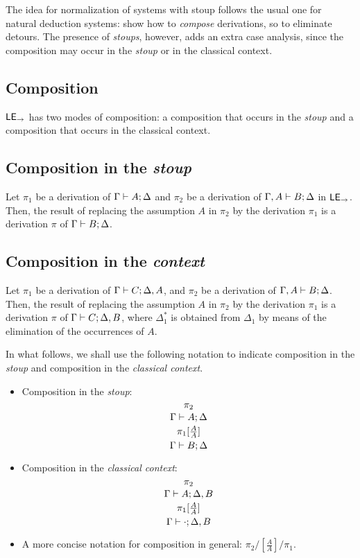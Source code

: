 
The idea for normalization  of systems with stoup follows the usual one for natural deduction systems: show how to {\em compose} derivations, so to eliminate detours. The presence of {\em stoups}, however, adds an extra case analysis, since the composition may occur in the {\em stoup} or in the classical context. 
\subsection{Composition}
$\mathsf{LE}_{\to}$ has two modes of composition: a composition that occurs in the \textit{stoup} and a composition that occurs in the classical context. 

\subsection{Composition in the \textit{stoup}}
\begin{theorem}\label{thm:comp-stoup}
Let $\pi_{1}$ be a derivation of $\Gamma\vdash A;\Delta$ and $\pi_{2}$ be a derivation of $\Gamma,A\vdash B;\Delta$ in $\mathsf{LE}_{\to}$. Then, the result of replacing the assumption $A$ in $\pi_{2}$ by the derivation $\pi_{1}$ is a derivation $\pi$ of $\Gamma\vdash B;\Delta$. 
\end{theorem}


\subsection{Composition in the \textit{context}}
\begin{theorem}
Let $\pi_{1}$ be a derivation of $\Gamma\vdash C;\Delta,A$, and $\pi_{2}$ be a derivation of $\Gamma,A\vdash B;\Delta$. Then, the result of replacing the assumption $A$ in $\pi_{2}$ by the derivation $\pi_{1}$ is a derivation $\pi$ of $\Gamma\vdash C;\Delta, B$, where  $\Delta_{1}^{*}$ is obtained from $\Delta_{1}$ by means of the elimination of the occurrences of $A$.
\end{theorem}


In what follows, we shall use the following notation to indicate composition in the \textit{stoup}  and composition  in the \textit{classical context}.
\begin{itemize}
\item Composition in the \textit{stoup}:
\[
\deduce{\stp{\Gamma}{B}{\Delta}}
{\deduce{}
{\deduce{\pi_1[\frac{A}{A}]}
{\deduce{}
{\deduce{\stp{\Gamma}{A}{\Delta}}
{\deduce{}{\pi_2}}}}}}
\]


\item Composition in the \textit{classical context}:
\[
\deduce{\stp{\Gamma}{\cdot}{\Delta,B}}
{\deduce{}
{\deduce{\pi_1[\frac{A}{A}]}
{\deduce{}
{\deduce{\stp{\Gamma}{A}{\Delta,B}}
{\deduce{}{\pi_2}}}}}}
\]

\item A more concise notation for composition in general: $\pi_{2}/[\frac{A}{A}]/\pi_{1}$.

\end{itemize}

